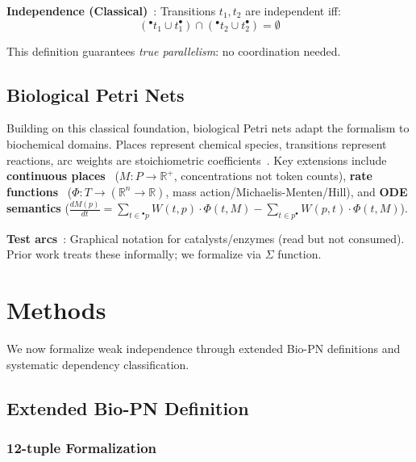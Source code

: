 \documentclass[twocolumn,11pt]{article}
\newcommand{\preset}[1]{\ensuremath{{}^{\bullet}#1}}
\newcommand{\postset}[1]{\ensuremath{#1^{\bullet}}}
\begin{document}
\textbf{Independence (Classical)}~\cite{Reisig2013}: Transitions $t_1, t_2$ are independent iff:
\begin{equation}
(\preset{t_1} \cup \postset{t_1}) \cap (\preset{t_2} \cup \postset{t_2}) = \emptyset
\label{eq:classical_independence}
\end{equation}

This definition guarantees \emph{true parallelism}: no coordination needed.

\subsection{Biological Petri Nets}

Building on this classical foundation, biological Petri nets adapt the formalism to biochemical domains. Places represent chemical species, transitions represent reactions, arc weights are stoichiometric coefficients~\cite{Reddy1993}. Key extensions include \textbf{continuous places}~\cite{Heiner2008} ($M: P \to \mathbb{R}^+$, concentrations not token counts), \textbf{rate functions}~\cite{Gilbert2006} ($\Phi: T \to (\mathbb{R}^n \to \mathbb{R})$, mass action/Michaelis-Menten/Hill), and \textbf{ODE semantics} ($\frac{dM(p)}{dt} = \sum_{t \in \preset{p}} W(t,p) \cdot \Phi(t, M) - \sum_{t \in \postset{p}} W(p,t) \cdot \Phi(t, M)$).

\textbf{Test arcs}~\cite{Koch2011}: Graphical notation for catalysts/enzymes (read but not consumed). Prior work treats these informally; we formalize via $\Sigma$ function.

\section{Methods}

We now formalize weak independence through extended Bio-PN definitions and systematic dependency classification.

\subsection{Extended Bio-PN Definition}

\subsubsection{12-tuple Formalization}
\end{document}
